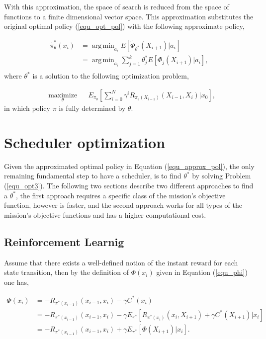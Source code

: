 \documentclass[12pt]{aastex62}
\theoremstyle{definition}
\DeclareMathOperator*{\argmin}{arg\,min}
\begin{document}
With this approximation, the space of search is reduced from the space of functions to a finite dimensional vector space. This approximation substitutes the original optimal policy (\ref{equ_opt_pol}) with the following approximate policy,

\begin{equation}\label{equ_approx_pol}
\begin{aligned}
\tilde{\pi}_{\theta}^*(x_{i})& = \argmin_{a_{i}} E[ \tilde{\Phi}_{\theta^*}(X_{i+1}) | a_{i}]\\
& =  \argmin_{a_{i}} \sum_{j=1}^k \theta^*_j E[\Phi_j(X_{i+1}) | a_{i}],\\
\end{aligned}
\end{equation}
where $\theta^*$ is a solution to the following optimization problem,

\begin{equation}\label{equ_opt3}
\begin{aligned}
& \underset{\theta}{\text{maximize}}
& & E_{\pi_{\theta}}[\sum_{i=0}^N \gamma^i R_{\pi_{\theta} (X_{i-1})}(X_{{i-1}}, X_{i}) | x_0],
\end{aligned}
\end{equation}
in which policy $\pi$ is fully determined by $\theta$.
 
 
\section{Scheduler optimization}\label{sec_opt}

Given the approximated optimal policy in Equation (\ref{equ_approx_pol}), the only remaining fundamental step to have a scheduler, is to find $\theta^*$ by solving Problem (\ref{equ_opt3}). The following two sections describe two different approaches to find a $\theta^*$, the first approach requires a specific class of the mission's objective function, however is faster, and the second approach works for all types of the mission's objective functions and has a higher computational cost. 

\subsection{Reinforcement Learnig}

Assume that there exists a well-defined notion of the instant reward for each state transition, then by the definition of $\Phi(x_{{i}})$ given in Equation (\ref{equ_phi}) one has,

\begin{equation}
\begin{aligned}
\Phi(x_{i}) &= - R_{\pi^*(x_{i-1})}(x_{i-1},x_i) - \gamma C^*({x_{i}})\\
&= - R_{\pi^*(x_{i-1})}(x_{i-1},x_i) - \gamma E_{\pi^*}[R_{\pi^*(x_{i})}(x_{i},X_{i+1})  +\gamma C^*({X_{{i+1}}})|x_i]\\
&= - R_{\pi^*(x_{i-1})}(x_{i-1},x_i)  + \gamma E_{\pi^*}[\Phi(X_{{i+1}})|x_i].\\
\end{aligned}
\end{equation}
\end{document}
